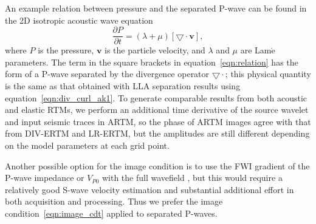 \documentclass[manuscript,ulem,graphix,revised]{geophysics}
\begin{document}
An example relation between pressure and the separated P-wave can be found in the 2D isotropic acoustic wave equation
\begin{equation}
\frac{\partial P}{\partial t}=(\lambda+\mu) [\bigtriangledown \cdot  \boldsymbol{v}],
\label{eqn:relation}
\end{equation}
where $P$ is the pressure, $\boldsymbol{v}$ is the particle velocity, and $\lambda$ and $\mu$ are Lam$\acute{\mathrm{e}}$ parameters. The term in the square brackets in equation~\ref{eqn:relation} has the form of a P-wave separated by the divergence operator $\bigtriangledown \cdot$; this physical quantity is the same as that obtained with LLA separation results using equation~\ref{eqn:div_curl_ak1}. 
To generate comparable results from both acoustic and elastic RTMs, we perform an additional time derivative of the source wavelet and input seismic traces in ARTM, so the phase of ARTM images agree with that from DIV-ERTM and LR-ERTM, but the amplitudes are still different depending on the model parameters at each grid point.

Another possible option for the image condition is to use the FWI gradient of the P-wave impedance or $V_{P0}$ with the full wavefield \citep{operto13,wang17}, but this would require a relatively good S-wave velocity estimation and substantial additional effort in both acquisition and processing. Thus we prefer the image condition~\ref{eqn:image_cdt} applied to separated P-waves.
\end{document}
